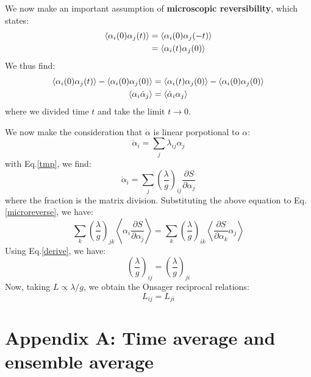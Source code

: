 \documentclass{article}
\begin{document}
We now make an important assumption of \textbf{microscopic reversibility}, which 
states:
\begin{align}
    \langle \alpha_i(0)\alpha_j(t) \rangle &= 
    \langle \alpha_i(0)\alpha_j(-t) \rangle \notag \\ 
    &= \langle \alpha_i(t)\alpha_j(0) \rangle
\end{align}
We thus find:
\begin{gather}
    \langle \alpha_i(0)\alpha_j(t) \rangle - \langle \alpha_i(0)\alpha_j(0) \rangle  
    = \langle \alpha_i(t)\alpha_j(0) \rangle - \langle \alpha_i(0)\alpha_j(0) \rangle   \notag \\
    \langle \alpha_i \dot{\alpha}_j \rangle = \langle \dot{\alpha}_i \alpha_j \rangle \label{microreverse}
\end{gather}
where we divided time $t$ and take the limit $t \to 0$.

We now make the consideration that $\dot{\alpha}$ is linear porpotional to $\alpha$:
\begin{equation}
    \dot{\alpha}_i = \sum_j \lambda_{ij} \alpha_j
\end{equation}
with Eq.\ref{tmp}, we find:
\begin{equation}
    \dot{\alpha}_i = \sum_{j} \left( \frac{\lambda}{g} \right)_{ij} \frac{\partial S}{\partial \alpha_j} 
\end{equation}
where the fraction is the matrix division. Substituting the above equation to Eq.\ref{microreverse}, we have:
\begin{equation}
    \sum_{k} \left( \frac{\lambda}{g} \right)_{jk} \left\langle \alpha_i \frac{\partial S}{\partial \alpha_j} \right\rangle
    = \sum_{k} \left( \frac{\lambda}{g} \right)_{ik} \left\langle \frac{\partial S}{\partial \alpha_k} \alpha_j \right\rangle
\end{equation}
Using Eq.\ref{derive}, we have:
\begin{equation}
    \left( \frac{\lambda}{g} \right)_{ij} = \left(  \frac{\lambda}{g} \right)_{ji}
\end{equation}
Now, taking $L \propto \lambda / g$, we obtain the Onsager reciprocal relations:
\begin{equation}
    L_{ij} = L_{ji}
\end{equation}

\pagebreak
\section*{Appendix A: Time average and ensemble average}
\end{document}
